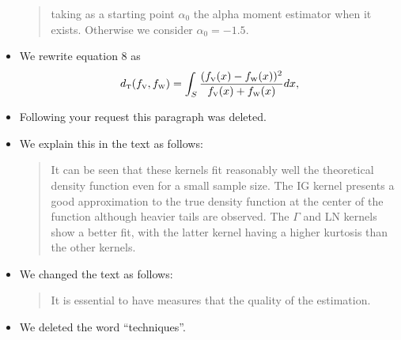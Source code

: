 \documentclass{ar2rc}
\begin{document}
\begin{itemize}
\begin{quote}
	taking as a starting point $\alpha_0$ the alpha moment estimator when it exists. Otherwise we consider $\alpha_0=-1.5$.
\end{quote}
\item We rewrite equation $8$ as 
\begin{equation}
	d_{\text{\tiny{T}}}(f_{\text{\tiny{V}}},f_{\text{\tiny{W}}})=\int_{S}\frac{(f_{\text{\tiny{V}}}(x)-f_{\text{\tiny{W}}}(x))^2}{f_{\text{\tiny{V}}}(x)+f_{\text{\tiny{W}}}(x)}dx,
	\label{DT}
\end{equation}

\item Following your request this paragraph was deleted.
\item We explain this in the text as follows:
\begin{quote}
	It can be seen that these kernels fit reasonably well the theoretical density function even for a small sample size. The IG kernel presents a good approximation to the true density function at the center of the function although heavier tails are observed. The $\Gamma$ and LN kernels show a better fit, with the latter kernel having a higher kurtosis than the other kernels.
\end{quote}
\item We changed the text as follows:
	\begin{quote}		
	It is essential to have measures that \DIFdelbegin {} \DIFdelend \DIFaddbegin {}\DIFaddend the quality of the estimation. 
	\end{quote}
\item We deleted the word ``techniques''.
\end{itemize}



	
\end{document}
